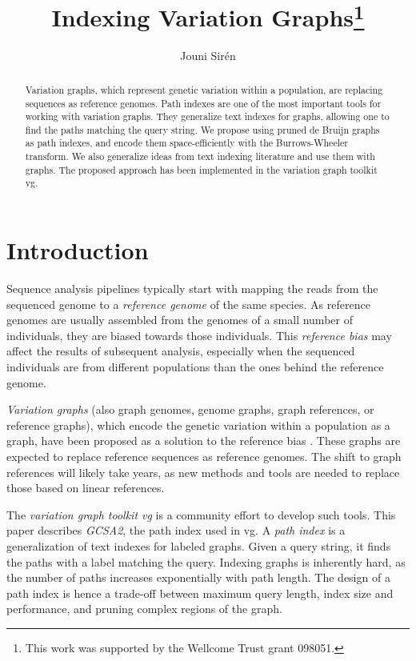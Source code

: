 \documentclass[a4paper,UKenglish]{lipics-v2016}
\title{Indexing Variation Graphs\footnote{This work was supported by the Wellcome Trust grant 098051.}}
\author[1]{Jouni Sirén}
\affil[1]{Wellcome Trust Sanger Institute, Hinxton, Cambridge, UK\\
  \texttt{jouni.siren@iki.fi}}
\begin{document}
\maketitle

\begin{abstract}
Variation graphs, which represent genetic variation within a population, are replacing sequences as reference genomes. Path indexes are one of the most important tools for working with variation graphs. They generalize text indexes for graphs, allowing one to find the paths matching the query string. We propose using pruned de Bruijn graphs as path indexes, and encode them space-efficiently with the Burrows-Wheeler transform. We also generalize ideas from text indexing literature and use them with graphs. The proposed approach has been implemented in the variation graph toolkit vg.
\end{abstract}


\section{Introduction}

Sequence analysis pipelines typically start with mapping the reads from the sequenced genome to a \emph{reference genome} of the same species. As reference genomes are usually assembled from the genomes of a small number of individuals, they are biased towards those individuals. This \emph{reference bias} may affect the results of subsequent analysis, especially when the sequenced individuals are from different populations than the ones behind the reference genome.

\emph{Variation graphs} (also graph genomes, genome graphs, graph references, or reference graphs), which encode the genetic variation within a population as a graph, have been proposed as a solution to the reference bias \cite{Paten2014,Marcus2014,Church2015,Dilthey2015,Marschall2016}. These graphs are expected to replace reference sequences as reference genomes. The shift to graph references will likely take years, as new methods and tools are needed to replace those based on linear references.

The \emph{variation graph toolkit vg} \cite{Garrison2014-2016} is a community effort to develop such tools. This paper describes \emph{GCSA2}, the path index used in vg. A \emph{path index} is a generalization of text indexes for labeled graphs. Given a query string, it finds the paths with a label matching the query. Indexing graphs is inherently hard, as the number of paths increases exponentially with path length. The design of a path index is hence a trade-off between maximum query length, index size and performance, and pruning complex regions of the graph.
\end{document}
